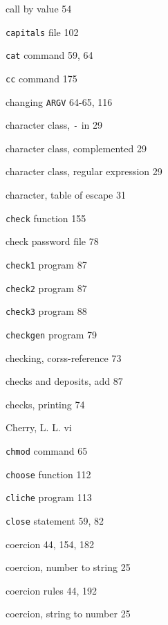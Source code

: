 \begin{multicols}{3}
\hangindent=4pc  call by value 54

\hangindent=4pc  \verb'capitals' file 102

\hangindent=4pc  \verb'cat' command 59, 64

\hangindent=4pc  \verb'cc' command 175

\hangindent=4pc  changing \verb'ARGV' 64-65, 116

\hangindent=4pc  character class, \verb'-' in 29

\hangindent=4pc  character class, complemented 29

\hangindent=4pc  character class, regular expression 29

\hangindent=4pc  character, table of escape 31

\hangindent=4pc  \verb'check' function 155

\hangindent=4pc  check password file 78

\hangindent=4pc  \verb'check1' program 87

\hangindent=4pc  \verb'check2' program 87

\hangindent=4pc  \verb'check3' program 88

\hangindent=4pc  \verb'checkgen' program 79

\hangindent=4pc  checking, corss-reference 73

\hangindent=4pc  checks and deposits, add 87

\hangindent=4pc  checks, printing 74

\hangindent=4pc  Cherry, L. L. vi

\hangindent=4pc  \verb'chmod' command 65

\hangindent=4pc  \verb'choose' function 112

\hangindent=4pc  \verb'cliche' program 113

\hangindent=4pc  \verb'close' statement 59, 82

\hangindent=4pc  coercion 44, 154, 182

\hangindent=4pc  coercion, number to string 25

\hangindent=4pc  coercion rules 44, 192

\hangindent=4pc  coercion, string to number 25


\end{multicols}
